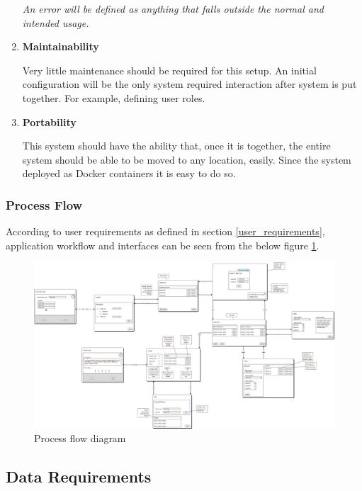 \documentclass[10pt]{article}
\begin{document}
\begin{enumerate}
\textit{An error will be defined as anything that falls outside the normal and intended usage.}


\item \textbf{Maintainability}

Very little maintenance should be required for this setup. An initial configuration will be
the only system required interaction after system is put together. For example, defining
user roles.


\item \textbf{Portability}

This system should have the ability that, once it is together, the entire system should be
able to be moved to any location, easily.  Since the system deployed as Docker containers
it is easy to do so.

\end{enumerate}
\newpage


\subsubsection{Process Flow} \label{process_flow}
According to user requirements as defined in section \ref{user_requirements}, application
workflow and interfaces can be seen from the below figure \ref{fig:views}.

\begin{figure}[ht!]
    \centering
    \includegraphics[width=\paperwidth, angle=270]{diagram-views.png}
    \caption{Process flow diagram}
    \label{fig:views}
\end{figure}
\newpage


\subsection{Data Requirements} \label{data_requirements}
\end{document}
